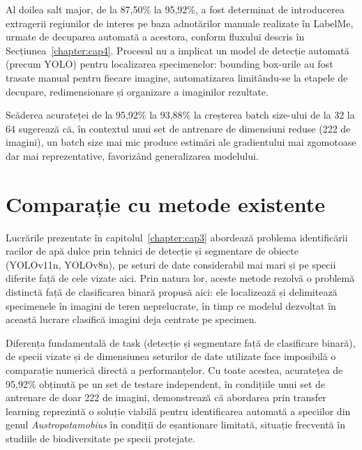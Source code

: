 Al doilea salt major, de la 87,50\% la 95,92\%, a fost determinat de introducerea extragerii regiunilor de interes pe baza adnotărilor manuale realizate în LabelMe, urmate de decuparea automată a acestora, conform fluxului descris în Secțiunea~\ref{chapter:cap4}. Procesul nu a implicat un model de detecție automată (precum YOLO) pentru localizarea specimenelor: bounding box-urile au fost trasate manual pentru fiecare imagine, automatizarea limitându-se la etapele de decupare, redimensionare și organizare a imaginilor rezultate.

Scăderea acurateței de la 95,92\% la 93,88\% la creșterea batch size-ului de la 32 la 64 sugerează că, în contextul unui set de antrenare de dimensiuni reduse (222 de imagini), un batch size mai mic produce estimări ale gradientului mai zgomotoase dar mai reprezentative, favorizând generalizarea modelului.

\section{Comparație cu metode existente}

Lucrările prezentate în capitolul~\ref{chapter:cap3} abordează problema identificării racilor de apă dulce prin tehnici de detecție și segmentare de obiecte (YOLOv11n, YOLOv8n), pe seturi de date considerabil mai mari și pe specii diferite față de cele vizate aici. Prin natura lor, aceste metode rezolvă o problemă distinctă față de clasificarea binară propusă aici: ele localizează și delimitează specimenele în imagini de teren neprelucrate, în timp ce modelul dezvoltat în această lucrare clasifică imagini deja centrate pe specimen.

Diferența fundamentală de task (detecție și segmentare față de clasificare binară), de specii vizate și de dimensiunea seturilor de date utilizate face imposibilă o comparație numerică directă a performanțelor. Cu toate acestea, acuratețea de 95,92\% obținută pe un set de testare independent, în condițiile unui set de antrenare de doar 222 de imagini, demonstrează că abordarea prin transfer learning reprezintă o soluție viabilă pentru identificarea automată a speciilor din genul \textit{Austropotamobius} în condiții de eșantionare limitată, situație frecventă în studiile de biodiversitate pe specii protejate.




